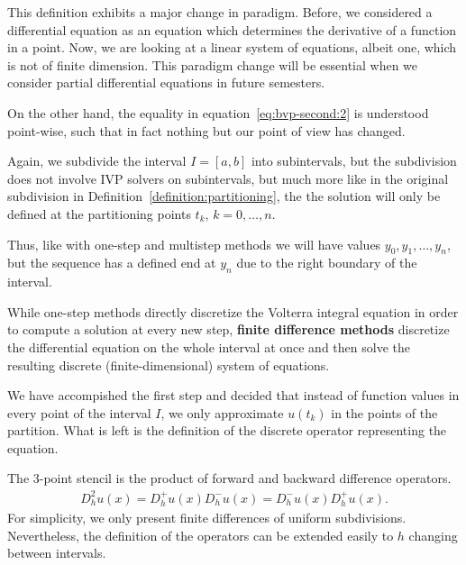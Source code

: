 

\begin{remark}
  This definition exhibits a major change in paradigm. Before, we
  considered a differential equation as an equation which determines
  the derivative of a function in a point. Now, we are looking at a
  linear system of equations, albeit one, which is not of finite
  dimension. This paradigm change will be essential when we consider
  partial differential equations in future semesters.
  
  On the other hand, the equality in equation~\eqref{eq:bvp-second:2}
  is understood point-wise, such that in fact nothing but our point of
  view has changed.
\end{remark}

\begin{intro}
  Again, we subdivide the interval $I= [a,b]$ into subintervals, but
  the subdivision does not involve IVP solvers on subintervals, but
  much more like in the original subdivision in
  Definition~\ref{definition:partitioning}, the the solution will only
  be defined at the partitioning points $t_k$, $k=0,\dots,n$.
  
  Thus, like with one-step and multistep methods we will have values
  $y_0, y_1,\dots, y_n$, but the sequence has a defined end at $y_n$
  due to the right boundary of the interval.

  While one-step methods directly discretize the Volterra integral
  equation in order to compute a solution at every new step,
  \textbf{finite difference methods} discretize the differential
  equation on the whole interval at once and then solve the resulting
  discrete (finite-dimensional) system of equations.

  We have accompished the first step and decided that instead of
  function values in every point of the interval $I$, we only
  approximate $u(t_k)$ in the points of the partition. What is left is
  the definition of the discrete operator representing the equation.
\end{intro}



\begin{remark}
  The 3-point stencil is the product of forward and backward
  difference operators.
  \begin{gather*}
    D^2_h u(x) = D^+_hu(x)D^-_hu(x) = D^-_hu(x)D^+_hu(x).
  \end{gather*}
  For simplicity, we only present finite differences of uniform
  subdivisions. Nevertheless, the definition of the operators can be
  extended easily to $h$ changing between intervals.
\end{remark}

